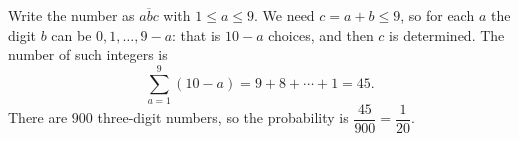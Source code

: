 Write the number as $\overline{abc}$ with $1\le a\le 9$. We need $c=a+b\le 9$, so for each $a$ the digit $b$ can be $0,1,\dots,9-a$: that is $10-a$ choices, and then $c$ is determined. The number of such integers is
\[\sum_{a=1}^{9}(10-a)=9+8+\cdots+1=45.\]
There are $900$ three-digit numbers, so the probability is $\dfrac{45}{900}=\boxed{\dfrac{1}{20}}$.
